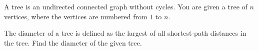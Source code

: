 A tree is an undirected connected graph without cycles.
You are given a tree of $n$ vertices, where the vertices are numbered from $1$ to $n$.

The diameter of a tree is defined as the largest of all shortest-path distances in the tree.
Find the diameter of the given tree.